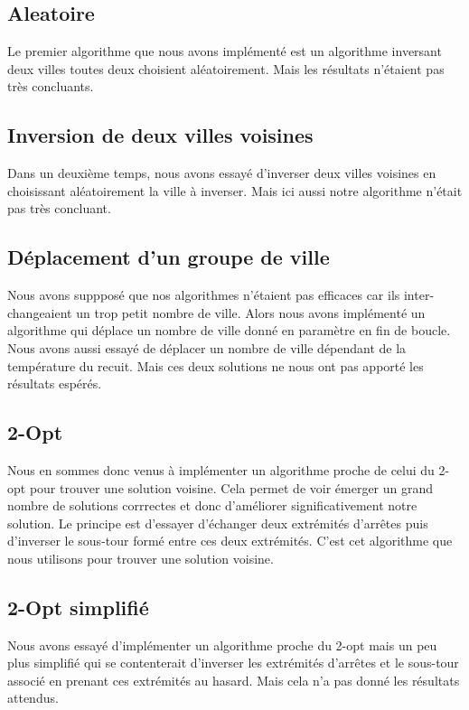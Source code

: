 \documentclass{article}
\begin{document}
\subsection{Aleatoire}

Le premier algorithme que nous avons implémenté est un algorithme inversant deux villes toutes deux choisient aléatoirement.
Mais les résultats n'étaient pas très concluants.

\subsection{Inversion de deux villes voisines}

Dans un deuxième temps, nous avons essayé d'inverser deux villes voisines en choisissant aléatoirement la ville à inverser.
Mais ici aussi notre algorithme n'était pas très concluant.

\subsection{Déplacement d'un groupe de ville}

Nous avons suppposé que nos algorithmes n'étaient pas efficaces car ils inter-changeaient un trop petit nombre de ville.
Alors nous avons implémenté un algorithme qui déplace un nombre de ville donné en paramètre en fin de boucle.
Nous avons aussi essayé de déplacer un nombre de ville dépendant de la température du recuit.
Mais ces deux solutions ne nous ont pas apporté les résultats espérés.

\subsection{2-Opt}

Nous en sommes donc venus à implémenter un algorithme proche de celui du 2-opt pour trouver une solution voisine.
Cela permet de voir émerger un grand nombre de solutions corrrectes et donc d'améliorer significativement notre solution.
Le principe est d'essayer d'échanger deux extrémités d'arrêtes puis d'inverser le sous-tour formé entre ces deux extrémités.
C'est cet algorithme que nous utilisons pour trouver une solution voisine.

\subsection{2-Opt simplifié}

Nous avons essayé d'implémenter un algorithme proche du 2-opt mais un peu plus simplifié qui se contenterait d'inverser les extrémités d'arrêtes et le sous-tour associé en prenant ces extrémités au hasard. Mais cela n'a pas donné les résultats attendus.
\end{document}
